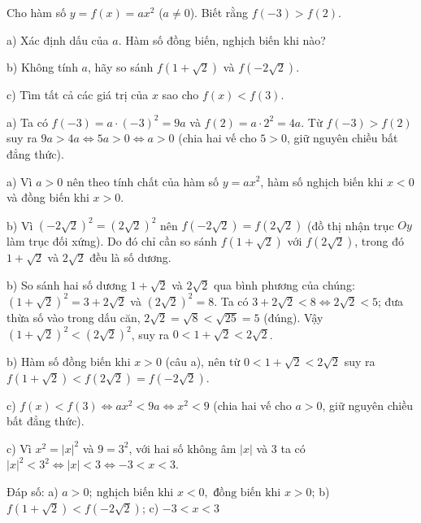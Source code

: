 \begin{problem}[9DS-HSB2-028]
Cho hàm số $y = f(x) = ax^2$ ($a \neq 0$). Biết rằng $f(-3) > f(2)$.

a) Xác định dấu của $a$. Hàm số đồng biến, nghịch biến khi nào?

b) Không tính $a$, hãy so sánh $f\left(1 + \sqrt{2}\right)$ và $f\left(-2\sqrt{2}\right)$.

c) Tìm tất cả các giá trị của $x$ sao cho $f(x) < f(3)$.

\begin{solution}
a) Ta có $f(-3) = a \cdot (-3)^2 = 9a$ và $f(2) = a \cdot 2^2 = 4a$. Từ $f(-3) > f(2)$ suy ra $9a > 4a \Leftrightarrow 5a > 0 \Leftrightarrow a > 0$ (chia hai vế cho $5 > 0$, giữ nguyên chiều bất đẳng thức).

a) Vì $a > 0$ nên theo tính chất của hàm số $y = ax^2$, hàm số nghịch biến khi $x < 0$ và đồng biến khi $x > 0$.

b) Vì $\left(-2\sqrt{2}\right)^2 = \left(2\sqrt{2}\right)^2$ nên $f\left(-2\sqrt{2}\right) = f\left(2\sqrt{2}\right)$ (đồ thị nhận trục $Oy$ làm trục đối xứng). Do đó chỉ cần so sánh $f\left(1 + \sqrt{2}\right)$ với $f\left(2\sqrt{2}\right)$, trong đó $1 + \sqrt{2}$ và $2\sqrt{2}$ đều là số dương.

b) So sánh hai số dương $1 + \sqrt{2}$ và $2\sqrt{2}$ qua bình phương của chúng: $\left(1 + \sqrt{2}\right)^2 = 3 + 2\sqrt{2}$ và $\left(2\sqrt{2}\right)^2 = 8$. Ta có $3 + 2\sqrt{2} < 8 \Leftrightarrow 2\sqrt{2} < 5$; đưa thừa số vào trong dấu căn, $2\sqrt{2} = \sqrt{8} < \sqrt{25} = 5$ (đúng). Vậy $\left(1 + \sqrt{2}\right)^2 < \left(2\sqrt{2}\right)^2$, suy ra $0 < 1 + \sqrt{2} < 2\sqrt{2}$.

b) Hàm số đồng biến khi $x > 0$ (câu a), nên từ $0 < 1 + \sqrt{2} < 2\sqrt{2}$ suy ra $f\left(1 + \sqrt{2}\right) < f\left(2\sqrt{2}\right) = f\left(-2\sqrt{2}\right)$.

c) $f(x) < f(3) \Leftrightarrow ax^2 < 9a \Leftrightarrow x^2 < 9$ (chia hai vế cho $a > 0$, giữ nguyên chiều bất đẳng thức).

c) Vì $x^2 = |x|^2$ và $9 = 3^2$, với hai số không âm $|x|$ và $3$ ta có $|x|^2 < 3^2 \Leftrightarrow |x| < 3 \Leftrightarrow -3 < x < 3$.

Đáp số: a) $\boxed{a > 0;\ \text{nghịch biến khi } x < 0, \text{ đồng biến khi } x > 0}$; b) $\boxed{f\left(1 + \sqrt{2}\right) < f\left(-2\sqrt{2}\right)}$; c) $\boxed{-3 < x < 3}$
\end{solution}
\end{problem}

